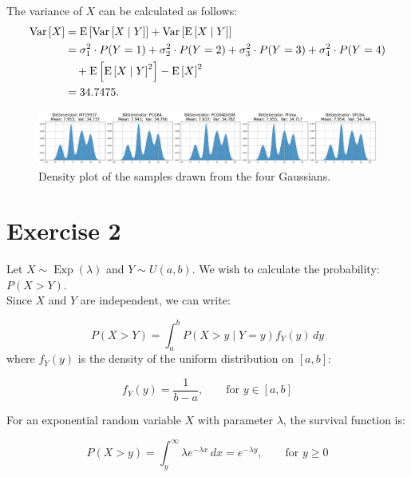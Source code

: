 \documentclass[a4paper,12pt]{article}
\renewenvironment{equation}
{\setlength{\mathindent}{0cm}%
  \begin{equation*}%
  }
  {
\end{equation*}}
\begin{document}
The variance of \(X\) can be calculated as follows:
\begin{equation}
  \begin{split}
    \operatorname{Var}\left[X\right] &= \operatorname{E}\left[\operatorname{Var}\left[X \mid Y\right]\right] + \operatorname{Var}\left[\operatorname{E}\left[X \mid Y\right]\right] \\
    &= \sigma^2_1 \cdot P(Y=1) + \sigma^2_2 \cdot P(Y=2) + \sigma^2_3 \cdot P(Y=3) + \sigma^2_4 \cdot P(Y=4) \\
    &\quad + \operatorname{E}\left[\operatorname{E}\left[X \mid Y\right]^2\right] - \operatorname{E}\left[X\right]^2 \\
    &= 34.7475.
  \end{split}
\end{equation}

\begin{figure}[H]
  \centering
  \includegraphics[width=1\textwidth]{images/ex1-plot.png}
  \caption{Density plot of the samples drawn from the four Gaussians.}
\end{figure}

\section*{Exercise 2}

Let \(X \sim \operatorname{Exp}(\lambda)\) and \(Y \sim U(a,b)\). We wish to calculate the probability: $P(X > Y)$.\\

Since \(X\) and \(Y\) are independent, we can write:

\begin{equation}
  P(X > Y) = \int_a^b P(X > y \mid Y = y) f_Y(y) \, dy
\end{equation}
where \(f_Y(y)\) is the density of the uniform distribution on \([a,b]\):

\begin{equation}
  f_Y(y) = \frac{1}{b-a}, \qquad \text{for } y \in [a,b]
\end{equation}

For an exponential random variable \(X\) with parameter \(\lambda\), the survival function is:

\begin{equation}
  P(X > y) = \int_y^\infty \lambda e^{-\lambda x} \, dx = e^{-\lambda y}, \qquad \text{for } y \ge 0
\end{equation}
\end{document}
